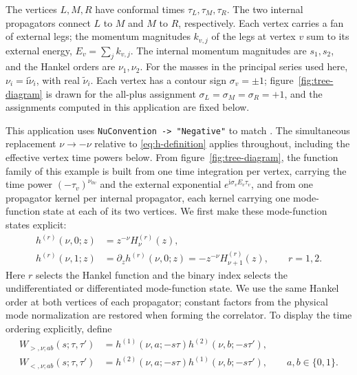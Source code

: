 \documentclass[11pt,a4paper]{article}
\numberwithin{table}{section}
\newcommand{\ii}{\mathrm i}
\begin{document}
The vertices $L,M,R$ have conformal times $\tau_L,\tau_M,\tau_R$.
The two internal propagators connect $L$ to $M$ and $M$ to $R$, respectively.
Each vertex carries a fan of external legs; the momentum magnitudes $k_{v,j}$
of the legs at vertex $v$ sum to its external energy, $E_v=\sum_j k_{v,j}$.
The internal momentum magnitudes are $s_1,s_2$, and the Hankel orders are
$\nu_1,\nu_2$. For the masses in the principal series used here,
$\nu_i=\ii\widetilde\nu_i$, with real $\widetilde\nu_i$.
Each vertex has a contour sign $\sigma_v=\pm1$;
figure~\ref{fig:tree-diagram} is drawn for the all-plus assignment
$\sigma_L=\sigma_M=\sigma_R=+1$, and the assignments computed in this
application are fixed below.

This application uses \texttt{NuConvention -> "Negative"} to match \cite{Chen:2024glu}.
The simultaneous replacement $\nu\to-\nu$ relative to \eqref{eq:h-definition} applies
throughout, including the effective vertex time powers below.
From figure~\ref{fig:tree-diagram}, the function family of this example is built from one time
integration per vertex, carrying the time power $(-\tau_v)^{\nu_{0v}}$ and the external exponential
$e^{\ii\sigma_vE_v\tau_v}$, and from one propagator kernel per internal propagator, each kernel
carrying one mode-function state at each of its two vertices. We first make these mode-function
states explicit:
\begin{equation}
 \begin{aligned}
 h^{(r)}(\nu,0;z)&=z^{-\nu}H^{(r)}_\nu(z),\\
 h^{(r)}(\nu,1;z)&=\partial_z h^{(r)}(\nu,0;z)
                  =-z^{-\nu}H^{(r)}_{\nu+1}(z),
 \qquad r=1,2.
 \end{aligned}
 \label{eq:application-endpoint-states}
\end{equation}
Here $r$ selects the Hankel function and the binary index selects the
undifferentiated or differentiated mode-function state. We use the same Hankel order
at both vertices of each propagator; constant factors from the physical mode
normalization are restored when forming the correlator.
To display the time ordering explicitly, define
\begin{equation}
 \begin{aligned}
 W_{>,\nu;ab}(s;\tau,\tau')
 &=h^{(1)}(\nu,a;-s\tau)h^{(2)}(\nu,b;-s\tau'),\\
 W_{<,\nu;ab}(s;\tau,\tau')
 &=h^{(2)}(\nu,a;-s\tau)h^{(1)}(\nu,b;-s\tau'),
 \qquad a,b\in\{0,1\}.
 \end{aligned}
 \label{eq:application-line-products}
\end{equation}
\end{document}
